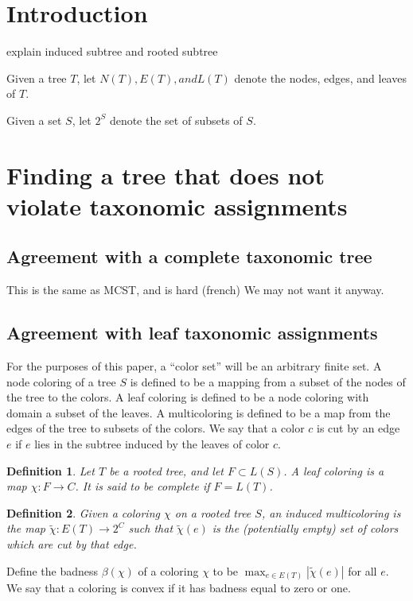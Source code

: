 \documentclass{amsart}
\newcommand{\col}{\chi}
\newcommand{\colt}{\tilde{\chi}}
\newcommand{\bad}{\beta}
\newtheorem{defn}{Definition}
\begin{document}
\section{Introduction}

explain induced subtree and rooted subtree

Given a tree $T$, let $N(T), E(T), and L(T)$ denote the nodes, edges, and leaves of $T$.

Given a set $S$, let $2^S$ denote the set of subsets of $S$.

\section{Finding a tree that does not violate taxonomic assignments}

\subsection{Agreement with a complete taxonomic tree}
This is the same as MCST, and is hard (french)
We may not want it anyway.

\subsection{Agreement with leaf taxonomic assignments}

For the purposes of this paper, a ``color set'' will be an arbitrary finite set.
A node coloring of a tree $S$ is defined to be a mapping from a subset of the nodes of the tree to the colors.
A leaf coloring is defined to be a node coloring with domain a subset of the leaves.
A multicoloring is defined to be a map from the edges of the tree to subsets of the colors.
We say that a color $c$ is cut by an edge $e$ if $e$ lies in the subtree induced by the leaves of color $c$.

\begin{defn}
  Let $T$ be a rooted tree, and let $F \subset L(S)$.
  A leaf coloring is a map $\col: F \rightarrow C$.
  It is said to be complete if $F = L(T)$.
\end{defn}

\begin{defn}
  Given a coloring $\col$ on a rooted tree $S$, an induced multicoloring is the map $\colt: E(T) \rightarrow 2^C$
  such that $\colt(e)$ is the (potentially empty) set of colors which are cut by that edge.
\end{defn}

Define the badness $\bad(\col)$ of a coloring $\col$ to be $\max_{e \in E(T)} |\colt(e)| $ for all $e$.
We say that a coloring is convex if it has badness equal to zero or one.
\end{document}
